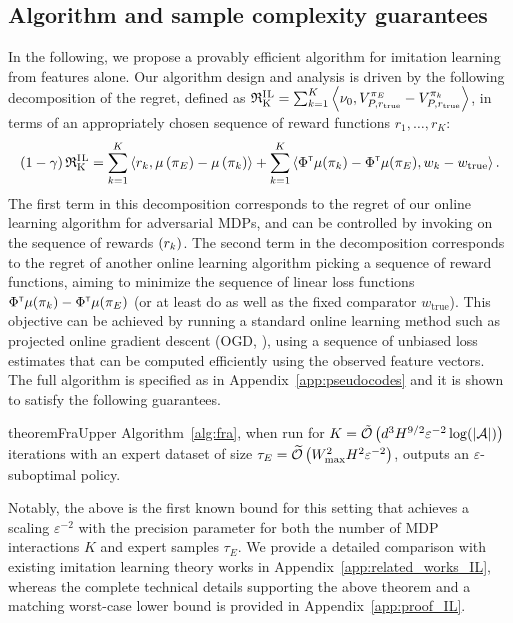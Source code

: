 \subsection{Algorithm and sample complexity guarantees} 
In the following, we propose a provably efficient algorithm for imitation learning from features alone.
Our algorithm design and analysis is driven by the following decomposition of the regret, defined as $\operatorname{\mathfrak{R}_K^\mathrm{I\hspace{.05em}L}} = \sum^K_{k=1}\left\langle{\nu_0},{V^{{\pi_E}}_{P,r_{\textup{true}}} - V^{\pi_k}_{P,r_{\textup{true}}}}\right\rangle$, in terms of an appropriately chosen sequence of reward functions $r_1,\dots,r_K$:
%
\begin{equation*}
    (1 - \gamma) \operatorname{\mathfrak{R}_K^\mathrm{I\hspace{.05em}L}} = \sum^K_{k=1} \left\langle{r_k},{\mu\left({{\pi_E}}\right) - \mu\left({\pi_k}\right)}\right\rangle + \sum^K_{k=1} \left\langle{\Phi^\mathsf{\scriptscriptstyle T}\mu(\pi_k) - \Phi^\mathsf{\scriptscriptstyle T}\mu({\pi_E})},{w_k - w_{\mathrm{true}}}\right\rangle.
\end{equation*}
%
The first term in this decomposition corresponds to the regret of our online learning algorithm for adversarial MDPs, and can be controlled by invoking \algname on the sequence of rewards $\left(r_k\right)$. The second term in the decomposition corresponds to the regret of another online learning algorithm picking a sequence of reward functions, aiming to minimize the sequence of linear loss functions $\Phi^\mathsf{\scriptscriptstyle T}\mu(\pi_k) - \Phi^\mathsf{\scriptscriptstyle T}\mu({\pi_E})$ (or at least do as well as the fixed comparator $w_{\mathrm{true}}$). This objective can be achieved by running a standard online learning method such as projected online gradient descent (OGD, \citealp{Zin03}), using a sequence of  unbiased loss estimates that can be computed efficiently using the observed feature vectors. 
The full algorithm is specified as  in Appendix~\ref{app:pseudocodes} and it is shown to satisfy the following guarantees.
%
\begin{restatable}{theorem}{FraUpper} \label{thm:FraUpper}
  Algorithm~\ref{alg:fra}, when run for $K = \tilde{\mathcal{O}}\left({d^{3} H^{9/2} \varepsilon^{-2}\log (\left|\mathcal{A}\right|)}\right)$ iterations with an expert dataset of size $\tau_E = \widetilde{\mathcal{O}}\left({ W_{\max}^2 H^2\varepsilon^{-2}}\right)$, outputs an $\varepsilon$-suboptimal policy.
\end{restatable}
%
Notably, the above is the first known bound for this setting that achieves 
a scaling $\varepsilon^{-2}$ with the precision parameter for both the number of MDP interactions $K$ and expert samples $\tau_E$. 
We provide a detailed comparison with existing imitation learning theory works in Appendix~\ref{app:related_works_IL}, 
whereas the complete technical details supporting the above theorem and a 
matching worst-case lower bound  is provided in Appendix~\ref{app:proof_IL}.

